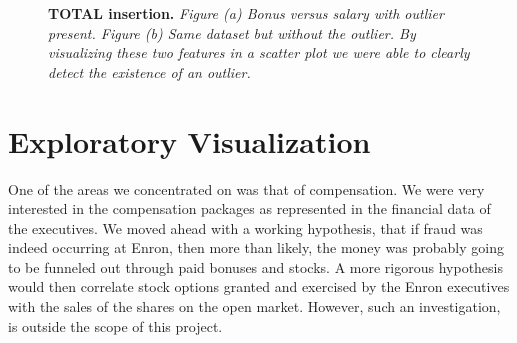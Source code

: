 \documentclass[twoside,openright,titlepage,numbers=noenddot,headinclude,%
               footinclude=true,cleardoublepage=empty,abstractoff,BCOR=5mm,%
               paper=a4,fontsize=11pt,ngerman,american]{scrreprt}
\numberwithin{theorem}{chapter}
\numberwithin{definition}{chapter}
\numberwithin{algorithm}{chapter}
\numberwithin{figure}{chapter}
\numberwithin{table}{chapter}
\numberwithin{equation}{chapter}
\begin{document}
\begin{figure}[!hbtp]
\centering
    
    \caption{\textbf{TOTAL insertion.} \textit{Figure (a) Bonus versus salary with outlier present. Figure (b) Same dataset but without the outlier. By visualizing these two features in a scatter plot we were able to clearly detect the existence of an outlier.}}
\end{figure}




\section*{Exploratory Visualization}

One of the areas we concentrated on was that of compensation. We were very interested in the compensation packages as represented in the financial data of the executives. We moved ahead with a working hypothesis, that if fraud was indeed occurring at Enron, then more than likely, the money was probably going to be funneled out through paid bonuses and stocks. A more rigorous hypothesis would then correlate stock options granted and exercised by the Enron executives with the sales of the shares on the open market. However, such an investigation, is outside the scope of this project. 
\end{document}
